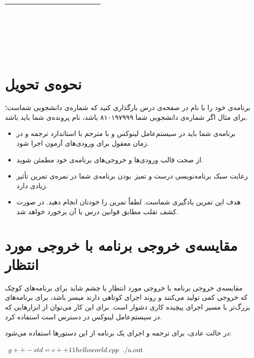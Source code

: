 \documentclass{utap}
\begin{document}
\begin{table}[H]
\begin{tabular}{|c|c|}
\begin{latin}
\begin{minipage}[]{0.3\textwidth}
\begin{verbatim}
					
					
					
					
					\end{verbatim}
			\end{minipage}\end{latin}
			\\
			\hline
		\end{tabular}
	\end{table}
	
	\section{نحوه‌ی تحویل}
	
	برنامه‌ی خود را با نام  در صفحه‌ی  درس بارگذاری کنید که  شماره‌ی دانشجویی شماست؛ برای مثال اگر شماره‌ی دانشجویی شما ۸۱۰۱۹۷۹۹۹ باشد، نام پرونده‌ی شما باید  باشد.
	
	\begin{itemize}
		\item برنامه‌ی شما باید در سیستم‌عامل لینوکس و با مترجم  با استاندارد  ترجمه و در زمان معقول برای ورودی‌های آزمون اجرا شود.
		\item از صحت قالب ورودی‌ها و خروجی‌های برنامه‌ی خود مطمئن شوید.
		\item رعایت سبک برنامه‌نویسی درست و تمیز~بودن برنامه‌ی شما در نمره‌ی تمرین تأثیر زیادی دارد.
		\item هدف این تمرین یادگیری شماست. لطفاً تمرین را خودتان انجام دهید. در صورت کشف تقلب مطابق قوانین درس با آن برخورد خواهد شد.
	\end{itemize}
	
	\appendix
	
	\section{مقایسه‌ی خروجی برنامه با خروجی مورد انتظار\label{sec:diff}}
	
	مقایسه‌ی خروجی برنامه با خروجی مورد انتظار با چشم شاید برای برنامه‌های کوچک که خروجی کمی تولید می‌کنند و روند اجرای کوتاهی دارند میسر باشد، برای برنامه‌های بزرگ‌تر با مسیر اجرای پیچیده کاری دشوار است. برای این کار می‌توان از ابزارهایی که در سیستم‌عامل لینوکس در دسترس است استفاده کرد.
	
	در حالت عادی، برای ترجمه و اجرای یک برنامه از این دستورها استفاده می‌شود:
	\begin{terminal}
 ~$ g++ -std=c++11 helloworld.cpp
 ~$ ./a.out
	\end{terminal}
	
\end{document}
